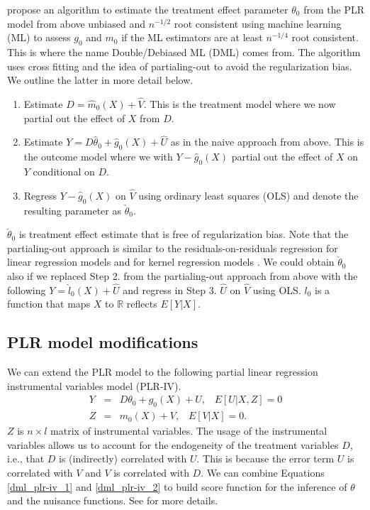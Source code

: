 \documentclass[10pt]{article}
\begin{document}
\cite{Cher2018} propose an algorithm to estimate the treatment effect parameter $\theta_0$ from the PLR model from above unbiased and $n^{-1/2}$ root consistent using machine learning (ML) to assess $g_0$ and $m_0$ if the ML estimators are at least  $n^{-1/4}$ root consistent.  
This is where the name Double/Debiased ML (DML) comes from. 
The algorithm uses cross fitting and the idea of partialing-out to avoid the regularization bias.  
We outline the latter in more detail below. 
\begin{enumerate}
	\item Estimate $D =  \hat{m}_0(X) + \hat{V}$. This is the treatment model where we now partial out the effect of $X$ from $D$.
	\item Estimate $Y = D  \hat{\theta}_0 +  \hat{g}_0(X) +  \hat{U}$ as in the naive approach from above. This is the outcome model where we with $Y - \hat{g}_0(X)$ partial out the effect of $X$ on $Y$ conditional on $D$.
	\item Regress $Y - \hat{g}_0(X)$ on $\hat{V}$ using ordinary least squares (OLS) and denote the resulting parameter as $\check{\theta}_0$.
\end{enumerate}
$\check{\theta}_0$ is treatment effect estimate that is free of regularization bias. 
Note that the partialing-out approach is similar to the residuals-on-residuals regression for linear regression models \cite{frisch1933,Lovell1963,Lovell2008} and for kernel regression models \cite{rob1988}.
We could obtain $\check{\theta}_0$ also if we replaced Step 2. from the partialing-out approach from above with the following $Y = \hat{l}_0(X) + \hat{U} $ and regress in Step 3. $\hat{U}$ on $\hat{V}$ using OLS. 
$l_0$ is a function that maps $X$ to $\mathbb{R}$ reflects $E[Y|X]$.

\subsection{PLR model modifications}
We can extend the PLR model to the following partial linear regression instrumental variables model (PLR-IV). 
\begin{eqnarray*}\label{dml_plr-iv_1}
	Y &=&  D  \theta_0 +  g_0(X) + U, \;\;\; E[U|X,Z] =0  	\\ \label{dml_plr-iv_2}
	Z &=&  m_0(X) + V, \;\;\; E[V|X] =0.
\end{eqnarray*}
$Z$ is $n \times l$ matrix of instrumental variables.
The usage of the instrumental variables allows us to account for the endogeneity of the treatment variables $D$, i.e., that $D$ is (indirectly) correlated with $U$.
This is because the error term $U$ is correlated with $V$ and $V$ is correlated with $D$.
We can combine Equations \eqref{dml_plr-iv_1} and \eqref{dml_plr-iv_2} to build score function for the inference of $\theta$ and the nuisance functions. 
See \cite{Cher2018} for more details.  %
\end{document}
